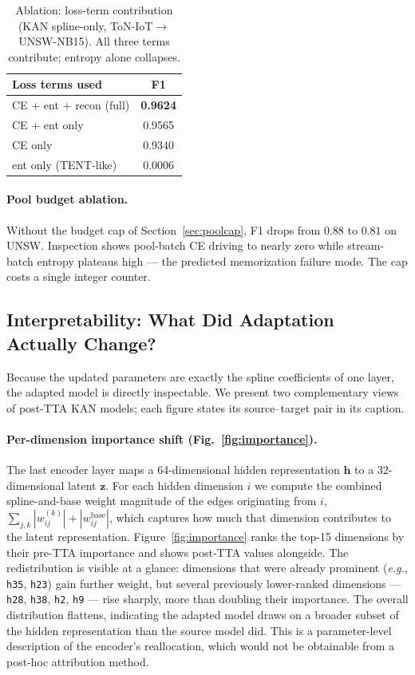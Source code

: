 \documentclass[10pt, conference, letterpaper]{IEEEtran}
\begin{document}
\begin{table}[h]
\centering
\caption{Ablation: loss-term contribution (KAN spline-only, ToN-IoT$\to$UNSW-NB15). All three terms contribute; entropy alone collapses.}
\label{tab:ablate_loss}
\begin{tabular}{lc}
\toprule
\textbf{Loss terms used} & \textbf{F1} \\
\midrule
CE + ent + recon (full)  & \textbf{0.9624} \\
CE + ent only            & 0.9565 \\
CE only                  & 0.9340 \\
ent only (TENT-like)     & 0.0006 \\
\bottomrule
\end{tabular}
\end{table}

\paragraph{Pool budget ablation.} Without the budget cap of Section~\ref{sec:poolcap}, F1 drops from $0.88$ to $0.81$ on UNSW. Inspection shows pool-batch CE driving to nearly zero while stream-batch entropy plateaus high --- the predicted memorization failure mode. The cap costs a single integer counter.


\subsection{Interpretability: What Did Adaptation Actually Change?}
\label{sec:rq4}

Because the updated parameters are exactly the spline coefficients of one layer, the adapted model is directly inspectable. We present two complementary views of post-TTA KAN models; each figure states its source--target pair in its caption.

\paragraph{Per-dimension importance shift (Fig.~\ref{fig:importance}).}
The last encoder layer maps a 64-dimensional hidden representation $\mathbf{h}$ to a 32-dimensional latent $\mathbf{z}$. For each hidden dimension $i$ we compute the combined spline-and-base weight magnitude of the edges originating from $i$, $\sum_{j,k} |w_{ij}^{(k)}| + |w^{\text{base}}_{ij}|$, which captures how much that dimension contributes to the latent representation. Figure~\ref{fig:importance} ranks the top-15 dimensions by their pre-TTA importance and shows post-TTA values alongside. The redistribution is visible at a glance: dimensions that were already prominent (\textit{e.g.}, \texttt{h35}, \texttt{h23}) gain further weight, but several previously lower-ranked dimensions --- \texttt{h28}, \texttt{h38}, \texttt{h2}, \texttt{h9} --- rise sharply, more than doubling their importance. The overall distribution flattens, indicating the adapted model draws on a broader subset of the hidden representation than the source model did. This is a parameter-level description of the encoder's reallocation, which would not be obtainable from a post-hoc attribution method.
\end{document}
